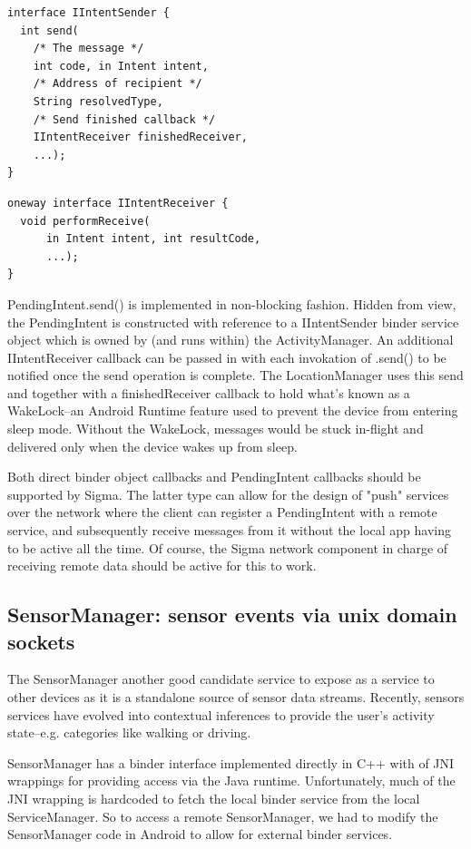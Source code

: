 \documentclass[prodmode]{acmlarge}
\begin{document}
\begin{Verbatim}[samepage=true]
interface IIntentSender {
  int send(
    /* The message */
    int code, in Intent intent,
    /* Address of recipient */
    String resolvedType,
    /* Send finished callback */
    IIntentReceiver finishedReceiver,
    ...);
}
\end{Verbatim}

\begin{Verbatim}[samepage=true]
oneway interface IIntentReceiver {
  void performReceive(
      in Intent intent, int resultCode,
      ...);
}
\end{Verbatim}

PendingIntent.send() is implemented in non-blocking fashion. Hidden from view, the PendingIntent is constructed with reference to a IIntentSender binder service object which is owned by (and runs within) the ActivityManager. An additional IIntentReceiver callback can be passed in with each invokation of .send() to be notified once the send operation is complete. The LocationManager uses this send and together with a finishedReceiver callback to hold what's known as a WakeLock--an Android Runtime feature used to prevent the device from entering sleep mode. Without the WakeLock, messages would be stuck in-flight and delivered only when the device wakes up from sleep.

Both direct binder object callbacks and PendingIntent callbacks should be supported by Sigma. The latter type can allow for the design of "push" services over the network where the client can register a PendingIntent with a remote service, and subsequently receive messages from it without the local app having to be active all the time. Of course, the Sigma network component in charge of receiving remote data should be active for this to work.

\subsection{SensorManager: sensor events via unix domain sockets}
The SensorManager another good candidate service to expose as a service to other devices as it is a standalone source of sensor data streams. Recently, sensors services have evolved into contextual inferences to provide the user's activity state--e.g. categories like walking or driving.

SensorManager has a binder interface implemented directly in C++ with of JNI wrappings for providing access via the Java runtime. Unfortunately, much of the JNI wrapping is hardcoded to fetch the local binder service from the local ServiceManager. So to access a remote SensorManager, we had to modify the SensorManager code in Android to allow for external binder services.
\end{document}
